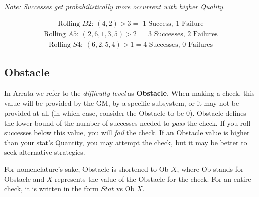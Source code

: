 \documentclass[../main.tex]{subfiles}
\begin{document}
    \emph{Note: Successes get probabilistically more occurrent with higher Quality.}
    \\
    \begin{mdframed}[style=Arrata]
        \begin{equation*}
            \begin{gathered}
                \text{Rolling $B2$: } (4,2) > 3 = \text{ 1 Success, 1 Failure}
            \end{gathered}
        \end{equation*}
        \begin{equation*}
            \begin{gathered}
                \text{Rolling $A5$: } (2, 6, 1, 3, 5) > 2 = \text{ 3 Successes, 2 Failures}
            \end{gathered}
        \end{equation*}
        \begin{equation*}
            \begin{gathered}
                \text{Rolling $S4$: } (6, 2, 5, 4) > 1 = \text{4 Successes, 0 Failures}
            \end{gathered}
        \end{equation*}
    \end{mdframed}

    \subsection{Obstacle}

    In Arrata we refer to the {\em difficulty level} as \textbf{Obstacle}. When making a check, this value will be provided by the GM, by a specific subsystem, or it may not be provided at all (in which case, consider the Obstacle to be 0). Obstacle defines the lower bound of the number of successes needed to {\em pass} the check. If you roll successes below this value, you will {\em fail} the check. If an Obstacle value is higher than your stat's Quantity, you may attempt the check, but it may be better to seek alternative strategies.

    For nomenclature's sake, Obstacle is shortened to Ob $X$, where Ob stands for Obstacle and $X$ represents the value of the Obstacle for the check. For an entire check, it is written in the form $Stat$ vs Ob $X$.
\end{document}
